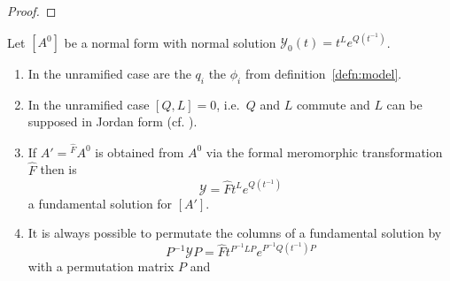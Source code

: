 \begin{proof}
  \TODO{}
\end{proof}
\begin{rem}
  Let $[A^0]$ be a normal form with normal solution
  $\mathcal{Y}_0(t)=t^L e^{Q(t^{-1})}$.
  \begin{enumerate}
    \item In the unramified case are the $q_i$ the $\phi_i$ from
      definition~\ref{defn:model}.
    \item In the unramified case
      $[Q,L]=0$, i.e.\ $Q$ and $L$ commute and $L$
      can be supposed in Jordan form (cf.  \cite[Sec.4]{Martinet1991}).
    \item If $A'={}^{\hat F}\!A^0$ is obtained from $A^0$ via the formal
      meromorphic transformation $\hat F$ then is
      \[
        \mathcal{Y}=\hat F t^L e^{Q(t^{-1})}
      \]
      a fundamental solution for $[A']$.
      \TODO[Why?]
    \item {}
      It is always possible to permutate the columns of a fundamental
      solution by
      \[
        P^{-1}\mathcal{Y}P=\hat F t^{P^{-1}LP} e^{P^{-1}Q(t^{-1})P}
      \]
      with a permutation matrix $P$ and 
  \end{enumerate}
\end{rem}
\begin{comment}
  \begin{lem}
    Let $\triangle$ be a system with fundamental solution
    $\mathcal{Y}_0(t)=t^L e^{Q(t^{-1})}$ then is the matrix
    ${A^0}:=dQ+L\frac{dt}{t}$ is a connection matrix for $\triangle$.
  \TODO[\textbf{Only} in the unramified/simple case?]
  \TODO[Therefore it is obtained from $A^0$ via an isotropy?]
  \end{lem}
\end{comment}

